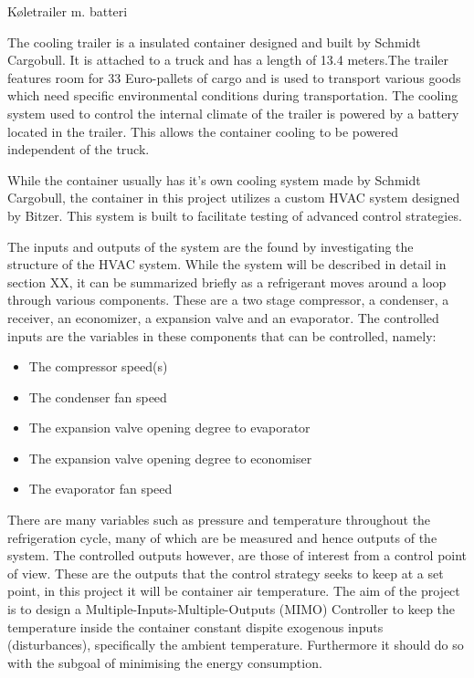 
Køletrailer m. batteri


The cooling trailer is a insulated container designed and built by Schmidt Cargobull. It is attached to a truck and has a length of 13.4 meters.The trailer features room for 33 Euro-pallets of cargo and is used to transport various goods which need specific environmental conditions during transportation. The cooling system used to control the internal climate of the trailer is powered by a battery located in the trailer. This allows the container cooling to be powered independent of the truck.

While the container usually has it's own cooling system made by Schmidt Cargobull, the container in this project utilizes a custom HVAC system designed by Bitzer. This system is built to facilitate testing of advanced control strategies.

The inputs and outputs of the system are the found by investigating the structure of the HVAC system. While the system will be described in detail in section XX, it can be summarized briefly as a refrigerant moves around a loop through various components. These are a two stage compressor, a condenser, a receiver, an economizer, a expansion valve and an evaporator. The controlled inputs are the variables in these components that can be controlled, namely:

\begin{itemize}
	\item The compressor speed(s)
	\item The condenser fan speed
	\item The expansion valve opening degree to evaporator
	\item The expansion valve opening degree to economiser
	\item The evaporator fan speed
\end{itemize}

There are many variables such as pressure and temperature throughout the refrigeration cycle, many of which are be measured and hence outputs of the system. 
The controlled outputs however, are those of interest from a control point of view. These are the outputs that the control strategy seeks to keep at a set point, in this project it will be container air temperature. The aim of the project is to design a Multiple-Inputs-Multiple-Outputs (MIMO) Controller to keep the temperature inside the container constant dispite exogenous inputs (disturbances), specifically the ambient temperature. Furthermore it should do so with the subgoal of minimising the energy consumption.

